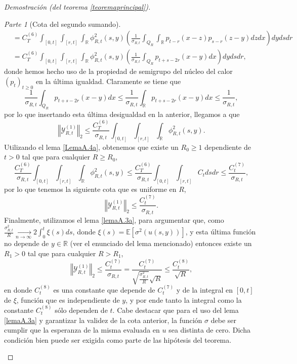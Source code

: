 \documentclass[letterpaper,twoside,12pt]{book}
\newcommand{\R}{\mathbb{R}}
\newcommand{\E}{\mathbb{E}}
\newcommand{\1}{\mathds{1}}
\renewcommand{\to}{\rightarrow}
\newcommand{\norm}[1]{\left\Vert #1 \right\Vert}
\theoremstyle{definition}
\theoremstyle{definition}
\theoremstyle{remark}
\newtheorem{proofpart}{Parte}
\theoremstyle{definition}
\theoremstyle{definition}
\theoremstyle{definition}
\theoremstyle{definition}
\theoremstyle{definition}
\begin{document}
\begin{proof}[Demostración (del teorema \ref{teoremaprincipal})]
\begin{proofpart}[Cota del segundo sumando]
\begin{align*}
   &=C^{(6)}_T\int_{[0,t]}\int_{[r,t]}\int_{\R}\phi_{R,t}^2(s,y)\left(\frac{1}{\sigma_{R,t}}\int_{Q_R}\int_\R p_{t-r}(x-z)p_{s-r}(z-y)dz dx\right)dy ds dr\\
   &=C^{(6)}_T\int_{[0,t]}\int_{[r,t]}\int_{\R}\phi_{R,t}^2(s,y)\left(\frac{1}{\sigma_{R,t}}\int_{Q_R}p_{t+s-2r}(x-y)dx\right)dy ds dr,
\end{align*}
donde hemos hecho uso de la propiedad de semigrupo del núcleo del calor $(p_t)_{t\geq0}$ en la última igualdad. Claramente se tiene que 
\[
   \frac{1}{\sigma_{R,t}}\int_{Q_R}p_{t+s-2r}(x-y)dx\leq \frac{1}{\sigma_{R,t}}\int_{\R}p_{t+s-2r}(x-y)dx\leq \frac{1}{\sigma_{R,t}},
\]
por lo que insertando esta última desigualdad en la anterior, llegamos a que 
\[
\norm{\mathcal{Y}_{R,t}^{(1)}}_2\leq \frac{C_T^{(6)}}{\sigma_{R,t}}\int_{[0,t]}\int_{[r,t]}\int_{\R}\phi_{R,t}^2(s,y).
\]
Utilizando el lema \ref{LemaA.4a}, obtenemos que existe un $R_0\geq1$ dependiente de $t>0$ tal que para cualquier $R\geq R_0$,
\[
   \frac{C_T^{(6)}}{\sigma_{R,t}}\int_{[0,t]}\int_{[r,t]}\int_{\R}\phi_{R,t}^2(s,y)\leq \frac{C_T^{(6)}}{\sigma_{R,t}}\int_{[0,t]}\int_{[r,t]}C_t ds dr\leq \frac{C_t^{(7)}}{\sigma_{R,t}},
\]
por lo que tenemos la siguiente cota que es uniforme en $R$,
\[
\norm{\mathcal{Y}_{R,t}^{(1)}}_2\leq \frac{C_t^{(7)}}{\sigma_{R,t}}.
\]
Finalmente, utilizamos el lema \ref{lemaA.3a}, para argumentar que, como $\tfrac{\sigma^2_{R,t}}{R} \xrightarrow[n\to\infty]{}2\int_{0}^{t}\xi(s)ds$, donde $\xi(s)=\E\left[\sigma^2(u(s,y))\right]$, y esta última función no depende de $y\in \R$ (ver el enunciado del lema mencionado) entonces existe un $R_1>0$ tal que para cualquier $R>R_1$,
\begin{equation}\label{cotafinal1}
      \norm{\mathcal{Y}_{R,t}^{(1)}}_2\leq \frac{C_t^{(7)}}{\sigma_{R,t}}=\frac{C_t^{(7)}}{\sqrt{\frac{\sigma_{R,t}^2}{R}}\sqrt{R}}\leq \frac{C_t^{(8)}}{\sqrt{R}},  
\end{equation}
en donde $C_t^{(8)}$ es una constante que depende de $C_t^{(7)}$ y de la integral en $[0,t]$ de $\xi$, función que es independiente de $y$, y por ende tanto la integral como la constante $C_t^{(8)}$ sólo dependen de $t$. Cabe destacar que para el uso del lema \ref{lemaA.3a} y garantizar la validez de la cota anterior, la función $\sigma$ debe ser cumplir que la esperanza de la misma evaluada en $u$ sea distinta de cero. Dicha condición bien puede ser exigida como parte de las hipótesis del teorema.  


\end{proofpart}
\end{proof}
\end{document}
